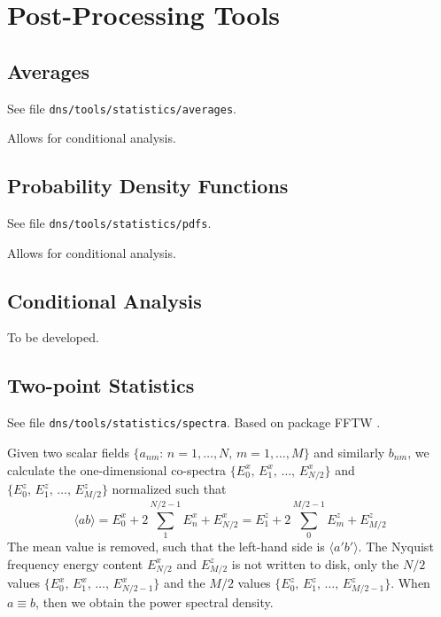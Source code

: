 \chapter{Post-Processing Tools}\label{sec:postprocessing}

\section{Averages}

See file {\tt dns/tools/statistics/averages}.

Allows for conditional analysis.

\section{Probability Density Functions}

See file {\tt dns/tools/statistics/pdfs}.

Allows for conditional analysis.

\section{Conditional Analysis}

To be developed.

\section{Two-point Statistics}
\sloppy

See file {\tt dns/tools/statistics/spectra}. Based on package FFTW \cite{Frigo:2005}.

Given two scalar fields $\{a_{nm}:\,n=1,\ldots,N,\,m=1,\ldots,M\}$ and similarly
$b_{nm}$, we calculate the one-dimensional co-spectra
$\{E^x_0,\,E^x_1,\,\ldots,\,E^x_{N/2}\}$ and
$\{E^z_0,\,E^z_1,\,\ldots,\,E^z_{M/2}\}$ normalized such that
\begin{equation}
\langle ab\rangle = E^x_0+2\sum_1^{N/2-1}E^x_n+E^x_{N/2} = E^z_1+2\sum_0^{M/2-1}E^z_m+E^z_{M/2}
\end{equation}
The mean value is removed, such that the left-hand side is $\langle
a'b'\rangle$. The Nyquist frequency energy content $E^x_{N/2}$ and $E^z_{M/2}$
is not written to disk, only the $N/2$ values
$\{E^x_0,\,E^x_1,\,\ldots,\,E^x_{N/2-1}\}$ and the $M/2$ values
$\{E^z_0,\,E^z_1,\,\ldots,\,E^z_{M/2-1}\}$. When $a\equiv b$, then we obtain the
power spectral density.


